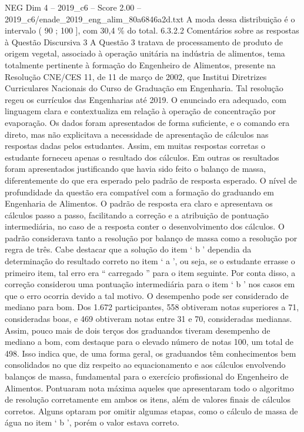\begin{textsample}{NEG Dim 4 – 2019\_c6 – Score 2.00 – 2019\_c6/enade\_2019\_eng\_alim\_80a6846a2d.txt}
A moda dessa distribuição é o intervalo ( 90 ; 100 ], com 30,4 \% do total. 6.3.2.2 Comentários sobre as respostas à Questão Discursiva 3 A Questão 3 tratava de processamento de produto de origem vegetal, associado à operação unitária na indústria de alimentos, tema totalmente pertinente à formação do Engenheiro de Alimentos, presente na Resolução CNE/CES 11, de 11 de março de 2002, que Institui Diretrizes Curriculares Nacionais do Curso de Graduação em Engenharia.
Tal resolução regeu os currículos das Engenharias até 2019.
O enunciado era adequado, com linguagem clara e contextualiza em relação à operação de concentração por evaporação.
Os dados foram apresentados de forma suficiente, e o comando era direto, mas não explicitava a necessidade de apresentação de cálculos nas respostas dadas pelos estudantes.
Assim, em muitas respostas corretas o estudante forneceu apenas o resultado dos cálculos.
Em outras os resultados foram apresentados justificando que havia sido feito o balanço de massa, diferentemente do que era esperado pelo padrão de resposta esperado.
O nível de profundidade da questão era compatível com a formação do graduando em Engenharia de Alimentos.
O padrão de resposta era claro e apresentava os cálculos passo a passo, facilitando a correção e a atribuição de pontuação intermediária, no caso de a resposta conter o desenvolvimento dos cálculos.
O padrão considerava tanto a resolução por balanço de massa como a resolução por regra de três.
Cabe destacar que a solução do item ‘ b ’ dependia da determinação do resultado correto no item ‘ a ’, ou seja, se o estudante errasse o primeiro item, tal erro era “ carregado ” para o item seguinte.
Por conta disso, a correção considerou uma pontuação intermediária para o item ‘ b ’ nos casos em que o erro ocorria devido a tal motivo.
O desempenho pode ser considerado de mediano para bom.
Dos 1.672 participantes, 558 obtiveram notas superiores a 71, consideradas boas, e 469 obtiveram notas entre 31 e 70, consideradas medianas.
Assim, pouco mais de dois terços dos graduandos tiveram desempenho de mediano a bom, com destaque para o elevado número de notas 100, um total de 498.
Isso indica que, de uma forma geral, os graduandos têm conhecimentos bem consolidados no que diz respeito ao equacionamento e aos cálculos envolvendo balanços de massa, fundamental para o exercício profissional do Engenheiro de Alimentos.
Pontuaram nota máxima aqueles que apresentaram todo o algoritmo de resolução corretamente em ambos os itens, além de valores finais de cálculos corretos.
Alguns optaram por omitir algumas etapas, como o cálculo de massa de água no item ‘ b ’, porém o valor estava correto.

\end{textsample}
